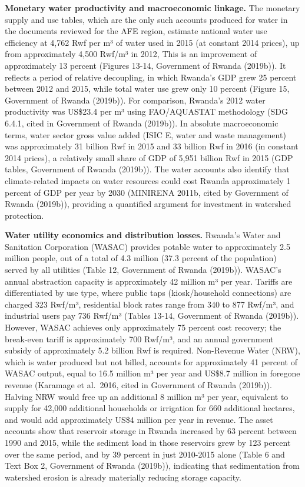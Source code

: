 \documentclass[
  letterpaper,
  DIV=11,
  numbers=noendperiod]{scrartcl}
\begin{document}
\textbf{Monetary water productivity and macroeconomic linkage.} The
monetary supply and use tables, which are the only such accounts
produced for water in the documents reviewed for the AFE region,
estimate national water use efficiency at 4,762 Rwf per m³ of water used
in 2015 (at constant 2014 prices), up from approximately 4,500 Rwf/m³ in
2012, This is an improvement of approximately 13 percent (Figures 13-14,
Government of Rwanda (2019b)). It reflects a period of relative
decoupling, in which Rwanda's GDP grew 25 percent between 2012 and 2015,
while total water use grew only 10 percent (Figure 15, Government of
Rwanda (2019b)). For comparison, Rwanda's 2012 water productivity was
US\$23.4 per m³ using FAO/AQUASTAT methodology (SDG 6.4.1, cited in
Government of Rwanda (2019b)). In absolute macroeconomic terms, water
sector gross value added (ISIC E, water and waste management) was
approximately 31 billion Rwf in 2015 and 33 billion Rwf in 2016 (in
constant 2014 prices), a relatively small share of GDP of 5,951 billion
Rwf in 2015 (GDP tables, Government of Rwanda (2019b)). The water
accounts also identify that climate-related impacts on water resources
could cost Rwanda approximately 1 percent of GDP per year by 2030
(MINIRENA 2011b, cited by Government of Rwanda (2019b)), providing a
quantified argument for investment in watershed protection.

\textbf{Water utility economics and distribution losses.} Rwanda's Water
and Sanitation Corporation (WASAC) provides potable water to
approximately 2.5 million people, out of a total of 4.3 million (37.3
percent of the population) served by all utilities (Table 12, Government
of Rwanda (2019b)). WASAC's annual abstraction capacity is approximately
42 million m³ per year. Tariffs are differentiated by use type, where
public taps (kiosk/household connections) are charged 323 Rwf/m³,
residential block rates range from 340 to 877 Rwf/m³, and industrial
users pay 736 Rwf/m³ (Tables 13-14, Government of Rwanda (2019b)).
However, WASAC achieves only approximately 75 percent cost recovery; the
break-even tariff is approximately 700 Rwf/m³, and an annual government
subsidy of approximately 5.2 billion Rwf is required. Non-Revenue Water
(NRW), which is water produced but not billed, accounts for
approximately 41 percent of WASAC output, equal to 16.5 million m³ per
year and US\$8.7 million in foregone revenue (Karamage et al.~2016,
cited in Government of Rwanda (2019b)). Halving NRW would free up an
additional 8 million m³ per year, equivalent to supply for 42,000
additional households or irrigation for 660 additional hectares, and
would add approximately US\$4 million per year in revenue. The asset
accounts show that reservoir storage in Rwanda increased by 63 percent
between 1990 and 2015, while the sediment load in those reservoirs grew
by 123 percent over the same period, and by 39 percent in just 2010-2015
alone (Table 6 and Text Box 2, Government of Rwanda (2019b)), indicating
that sedimentation from watershed erosion is already materially reducing
storage capacity.
\end{document}
